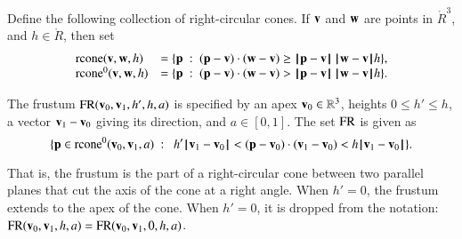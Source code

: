 %

\begin{definition}[rcone]\label{def:p:rcone}
%
Define the following collection of right-circular cones.
If ${\mathbf v}$ and ${\mathbf w}$ are points in $\ring{R}^3$, and
$h\in\ring{R}$, then set
\begin{displaymath}\begin{array}{lll}
\op{rcone}(\v,\w,h) 
&= \{\p\mid (\p-\v)\cdot (\w-\v) \ge \norm{\p}{\v}\,\norm{\w}{\v} h\},\\
\op{rcone}^0(\v,\w,h) 
&= \{\p\mid (\p-\v)\cdot (\w-\v) > \norm{\p}{\v}\,\norm{\w}{\v} h\}.\\
\end{array}
\end{displaymath}
\end{definition}
%
%
%
%


\begin{definition}[frustum, FR]
 The frustum
${\operatorname{FR}}({\mathbf v}_0,{\mathbf v}_1,h',h,a)$ is specified by an apex
${\mathbf v}_0\in\mathbb{R}^3$, heights $0\le h'\le h$, a vector ${\mathbf v}_1-{\mathbf v}_0$
giving its direction, and $a\in[0,1]$. The set ${\operatorname{FR}}$ is given as
\begin{displaymath}
\{ \p \in\op{rcone}^0(\v_0,\v_1,a) \mid \ 
h'\norm{\v_1}{\v_0} < (\p-\v_0) \cdot (\v_1-\v_0) < h\norm{\v_1}{\v_0} \}.
\end{displaymath}
%
%
%
\end{definition}

That is, the frustum is the part of a right-circular cone between two
parallel planes that cut the axis of the cone at a right angle.  When
$h'=0$, the frustum extends to the apex of the cone.  When $h'=0$, it
is dropped from the notation:
${\operatorname{FR}}({\mathbf v}_0,{\mathbf v}_1,h,a)={\operatorname{FR}}({\mathbf v}_0,{\mathbf v}_1,0,h,a)$.

